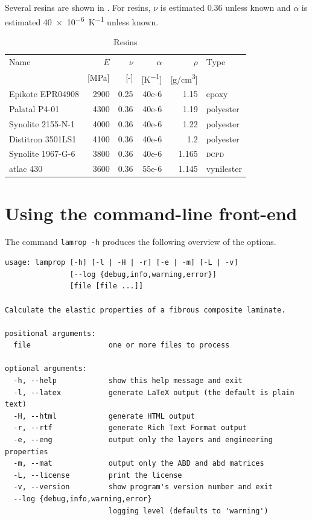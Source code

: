 \documentclass[a4paper,landscape,oneside,11pt,twocolumn]{memoir}
\begin{document}
Several resins are shown in . For resins, $\nu$ is estimated
0.36 unless known and $\alpha$ is estimated \SI{40e-6}{K^{-1}} unless known.

\begin{table}[!htbp]
  \centering
  \caption{\label{tb:resins}Resins}
  \begin{tabular}{lrrrrl}%
      Name & $E$ & $\nu$ & $\alpha$ & $\rho$ & Type\\
      & [\si{MPa}] & [-] & [\si{K^{-1}}] & [\si{g/cm^3}]\\
    \midrule
      Epikote EPR04908 & 2900 & 0.25 & 40e-6 & 1.15 & epoxy\\
      Palatal P4-01 & 4300 & 0.36 & 40e-6 & 1.19 & polyester\\
      Synolite 2155-N-1 & 4000 & 0.36 & 40e-6 & 1.22 & polyester\\
      Distitron 3501LS1 & 4100 & 0.36 & 40e-6 & 1.2 & polyester\\
      Synolite 1967-G-6 & 3800 & 0.36 & 40e-6 & 1.165 & \textsc{dcpd}\\
      atlac 430 & 3600 & 0.36 & 55e-6 & 1.145 & vynilester\\
  \end{tabular}
\end{table}

\section{Using the command-line front-end} %

The command \texttt{lamrop -h} produces the following overview of the options.

\begin{lstlisting}[style=plain]
usage: lamprop [-h] [-l | -H | -r] [-e | -m] [-L | -v]
               [--log {debug,info,warning,error}]
               [file [file ...]]

Calculate the elastic properties of a fibrous composite laminate.

positional arguments:
  file                  one or more files to process

optional arguments:
  -h, --help            show this help message and exit
  -l, --latex           generate LaTeX output (the default is plain text)
  -H, --html            generate HTML output
  -r, --rtf             generate Rich Text Format output
  -e, --eng             output only the layers and engineering properties
  -m, --mat             output only the ABD and abd matrices
  -L, --license         print the license
  -v, --version         show program's version number and exit
  --log {debug,info,warning,error}
                        logging level (defaults to 'warning')
\end{lstlisting}
\end{document}
